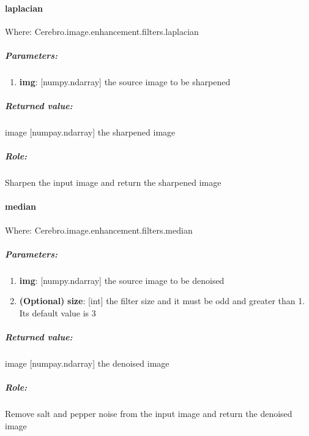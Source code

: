 \paragraph{laplacian}
Where: Cerebro.image.enhancement.filters.laplacian
\subparagraph{Parameters:}
\begin{changemargin}{0.5cm}{0cm}
\begin{enumerate} 
	\item \textbf{img}: [numpy.ndarray] the source image to be sharpened
\end{enumerate}
\end{changemargin}

\subparagraph{Returned value:}
\begin{changemargin}{1cm}{0cm}
	image [numpay.ndarray] the sharpened image
\end{changemargin}

\subparagraph{Role:}
\begin{changemargin}{1cm}{0cm}
	Sharpen the input image and return the sharpened image
\end{changemargin}

\paragraph{median}
Where: Cerebro.image.enhancement.filters.median
\subparagraph{Parameters:}
\begin{changemargin}{0.5cm}{0cm}
	\begin{enumerate}
		\item \textbf{img}: [numpy.ndarray] the source image to be denoised
		\item \textbf{(Optional)} \textbf{size}: [int] the filter size and it must be odd and greater than 1. Its default value is 3
	\end{enumerate}
\end{changemargin}

\subparagraph{Returned value:}
\begin{changemargin}{1cm}{0cm}
	image [numpay.ndarray] the denoised image
\end{changemargin}

\subparagraph{Role:}
\begin{changemargin}{1cm}{0cm}
 	Remove salt and pepper noise from the input image and return the denoised image
\end{changemargin}
 	
